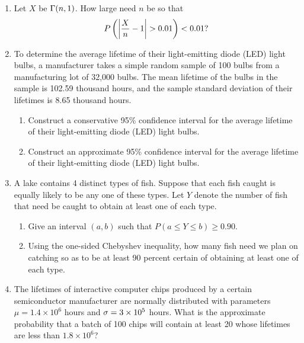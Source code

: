 \documentclass[12pt]{article}%
\newcommand{\0}{{\bf 0}}
\begin{document}
\begin{enumerate}
\item
Let $X$ be $\Gamma(n,1)$.
How large need $n$ be so that
$$
P\left(\left|\f{X}{n}-1\right|>0.01\right)<0.01?
$$



\item
To determine the average lifetime of their light-emitting diode (LED) light bulbs, a manufacturer takes a simple random sample of 100 bulbs from a manufacturing lot of 32,000 bulbs. The mean lifetime of the bulbs in the sample is 102.59 thousand hours, and the sample standard deviation of their lifetimes is 8.65 thousand hours.
\begin{enumerate}
\item
Construct a conservative 95\% confidence interval for the average lifetime of their light-emitting diode (LED) light bulbs. 
\item
Construct an approximate 95\% confidence interval for the average lifetime of their light-emitting diode (LED) light bulbs. 
\end{enumerate}




\item
A lake contains 4 distinct types of fish. Suppose that each fish caught is equally likely to be any one of these types. Let $Y$ denote the number of fish that need be caught to obtain at least one of
each type.
\begin{enumerate}
\item
Give an interval $(a, b)$ such that $P(a\le Y\le b)\ge 0.90$.
\item
Using the one-sided Chebyshev inequality,
how many fish need we plan on catching so as to be at least 90 percent certain of obtaining at least one of each type.
\end{enumerate}


\item 
The lifetimes of interactive computer chips produced by a certain semiconductor manufacturer are normally distributed with parameters $\mu = 1.4 \times 10^6$ hours and $\sigma = 3 \times 10^5$ hours.
What is the approximate probability that a batch of 100 chips will contain at least 20 
whose lifetimes are less than
$1.8 \times 10^6$? 








\end{enumerate}
\end{document}
